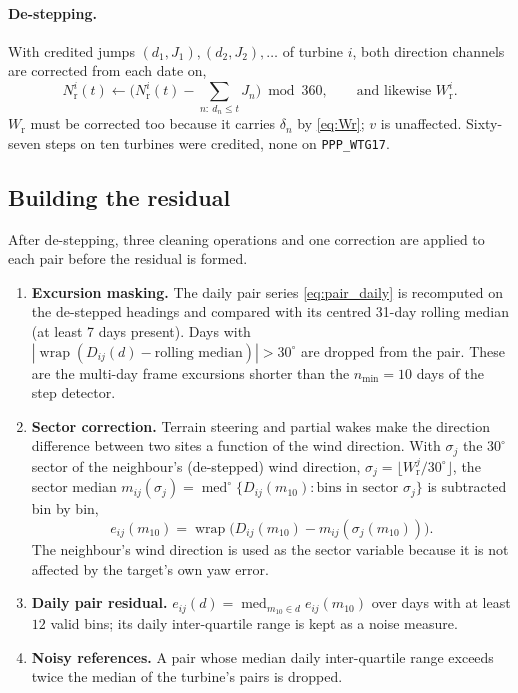 \documentclass[11pt,a4paper]{article}
\theoremstyle{remark}
\newcommand{\wrap}{\operatorname{wrap}}
\newcommand{\med}{\operatorname{med}}
\newcommand{\cmed}{\operatorname{med}^{\circ}}
\newcommand{\dg}{^{\circ}}
\newcommand{\code}[1]{\texttt{#1}}
\newcommand{\Wr}{W_{\mathrm{r}}}
\newcommand{\Nr}{N_{\mathrm{r}}}
\begin{document}
\paragraph{De-stepping.} With credited jumps $(d_1,J_1),(d_2,J_2),\dots$ of
turbine $i$, both direction channels are corrected from each date on,
\begin{equation}
  \Nr^{i}(t) \leftarrow \Big(\Nr^{i}(t) - \sum_{n:\ d_n\le t} J_n\Big) \bmod 360,
  \qquad \text{and likewise } \Wr^{i} .
  \label{eq:destep}
\end{equation}
$\Wr$ must be corrected too because it carries $\delta_n$ by \eqref{eq:Wr}; $v$
is unaffected. Sixty-seven steps on ten turbines were credited, none on
\code{PPP\_WTG17}.

\subsection{Building the residual}\label{sec:cons_build}
After de-stepping, three cleaning operations and one correction are applied
to each pair before the residual is formed.
\begin{enumerate}
\item \textbf{Excursion masking.} The daily pair series \eqref{eq:pair_daily}
      is recomputed on the de-stepped headings and compared with its centred
      31-day rolling median (at least 7 days present). Days with
      $|\wrap(D_{ij}(d) - \text{rolling median})| > 30\dg$ are dropped from the
      pair. These are the multi-day frame excursions shorter than the
      $n_{\min}=10$ days of the step detector.
\item \textbf{Sector correction.} Terrain steering and partial wakes make the
      direction difference between two sites a function of the wind direction.
      With $\sigma_j$ the $30\dg$ sector of the neighbour's (de-stepped) wind
      direction, $\sigma_j = \lfloor \Wr^j / 30\dg\rfloor$, the sector median
      $m_{ij}(\sigma_j) = \cmed\{D_{ij}(m_{10}) : \text{bins in sector } \sigma_j\}$
      is subtracted bin by bin,
      \begin{equation}
        e_{ij}(m_{10}) = \wrap\big(D_{ij}(m_{10}) - m_{ij}(\sigma_j(m_{10}))\big) .
        \label{eq:sector}
      \end{equation}
      The neighbour's wind direction is used as the sector variable because it
      is not affected by the target's own yaw error.
\item \textbf{Daily pair residual.} $e_{ij}(d) = \med_{m_{10}\in d} e_{ij}(m_{10})$
      over days with at least $12$ valid bins; its daily inter-quartile range is
      kept as a noise measure.
\item \textbf{Noisy references.} A pair whose median daily inter-quartile range
      exceeds twice the median of the turbine's pairs is dropped.
\end{enumerate}
\end{document}
